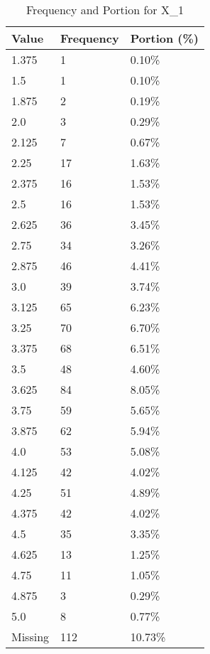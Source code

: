 \begin{table}[H]
\centering
\begin{tabular}{|l|l|l|}
\hline
\textbf{Value} & \textbf{Frequency} & \textbf{Portion (\%)} \\ \hline
1.375 & 1 & 0.10\% \\ \hline
1.5 & 1 & 0.10\% \\ \hline
1.875 & 2 & 0.19\% \\ \hline
2.0 & 3 & 0.29\% \\ \hline
2.125 & 7 & 0.67\% \\ \hline
2.25 & 17 & 1.63\% \\ \hline
2.375 & 16 & 1.53\% \\ \hline
2.5 & 16 & 1.53\% \\ \hline
2.625 & 36 & 3.45\% \\ \hline
2.75 & 34 & 3.26\% \\ \hline
2.875 & 46 & 4.41\% \\ \hline
3.0 & 39 & 3.74\% \\ \hline
3.125 & 65 & 6.23\% \\ \hline
3.25 & 70 & 6.70\% \\ \hline
3.375 & 68 & 6.51\% \\ \hline
3.5 & 48 & 4.60\% \\ \hline
3.625 & 84 & 8.05\% \\ \hline
3.75 & 59 & 5.65\% \\ \hline
3.875 & 62 & 5.94\% \\ \hline
4.0 & 53 & 5.08\% \\ \hline
4.125 & 42 & 4.02\% \\ \hline
4.25 & 51 & 4.89\% \\ \hline
4.375 & 42 & 4.02\% \\ \hline
4.5 & 35 & 3.35\% \\ \hline
4.625 & 13 & 1.25\% \\ \hline
4.75 & 11 & 1.05\% \\ \hline
4.875 & 3 & 0.29\% \\ \hline
5.0 & 8 & 0.77\% \\ \hline
Missing & 112 & 10.73\% \\ \hline
\end{tabular}
\caption{Frequency and Portion for X_1}
\end{table}

